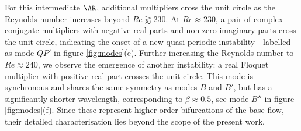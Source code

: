 For this intermediate $\AR$, additional multipliers cross the unit circle as the Reynolds number increases beyond $Re \gtrapprox 230$. At $Re \approx 230$, a pair of complex-conjugate multipliers with negative real parts and non-zero imaginary parts cross the unit circle, indicating the onset of a new quasi-periodic instability---labelled as mode $QP'$ in figure \ref{fig:modes}(e). Further increasing the Reynolds number to $Re \approx 240$, we observe the emergence of another instability: a real Floquet multiplier with positive real part crosses the unit circle. This mode is synchronous and shares the same symmetry as modes $B$ and $B'$, but has a significantly shorter wavelength, corresponding to $\beta \approx 0.5$, see mode $B''$ in figure \ref{fig:modes}(f). Since these represent higher-order bifurcations of the base flow, their detailed characterisation lies beyond the scope of the present work.


